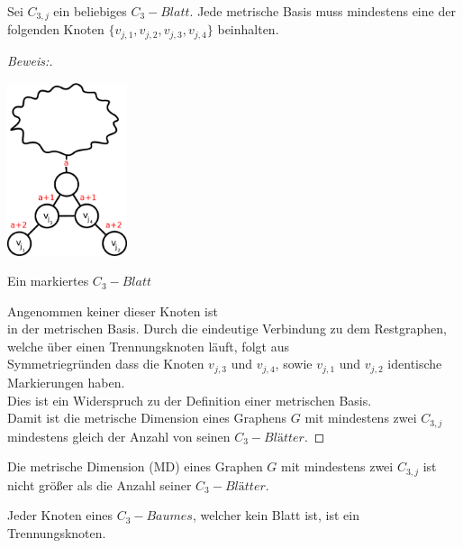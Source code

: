 \begin{lem}
Sei $C_{3,j}$ ein beliebiges $C_{3}-Blatt$. Jede metrische Basis muss mindestens eine der folgenden Knoten $\{v_{j,1},v_{j,2},v_{j,3},v_{j,4}\}$ beinhalten.
\end{lem}
\begin{proof}[Beweis:]~
\par
\vspace{-2mm}
\begin{floatingfigure}[l]{200pt}
{\flushleft
\hspace*{1.7cm}
\includegraphics[width=100pt]{bilder/beweis.pdf}}
\caption{Ein markiertes $C_{3}-Blatt$}
\end{floatingfigure}
Angenommen keiner dieser Knoten ist\\in der metrischen Basis. Durch die eindeutige Verbindung zu dem Restgraphen, welche über einen Trennungsknoten läuft, folgt aus\\Symmetriegründen dass die Knoten $v_{j,3}$ und $v_{j,4}$, sowie $v_{j,1}$ und $v_{j,2}$ identische Markierungen haben.\\Dies ist ein Widerspruch zu der Definition einer metrischen Basis.\\
Damit ist die metrische Dimension eines Graphens $G$ mit mindestens zwei $C_{3,j}$\\mindestens gleich der Anzahl von seinen $C_{3}-Blätter$.
\end{proof}
\par
\vspace{+3mm}
\begin{lem}
Die metrische Dimension (MD) eines Graphen $G$ mit mindestens zwei $C_{3,j}$ ist nicht größer als die Anzahl seiner $C_{3}-Blätter$. 
\end{lem}
\begin{lem}
\label{bkb}
Jeder Knoten eines $C_{3}-Baumes$, welcher kein Blatt ist, ist ein Trennungsknoten.
\end{lem}


